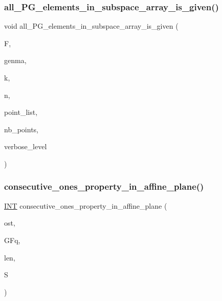 \subsubsection{\texorpdfstring{all\+\_\+\+P\+G\+\_\+elements\+\_\+in\+\_\+subspace\+\_\+array\+\_\+is\+\_\+given()}{all\_PG\_elements\_in\_subspace\_array\_is\_given()}}
{\footnotesize\ttfamily void all\+\_\+\+P\+G\+\_\+elements\+\_\+in\+\_\+subspace\+\_\+array\+\_\+is\+\_\+given (\begin{DoxyParamCaption}\item[{\mbox{\hyperlink{classfinite__field}{finite\+\_\+field}} $\ast$}]{F,  }\item[{\mbox{\hyperlink{galois_8h_a09fddde158a3a20bd2dcadb609de11dc}{I\+NT}} $\ast$}]{genma,  }\item[{\mbox{\hyperlink{galois_8h_a09fddde158a3a20bd2dcadb609de11dc}{I\+NT}}}]{k,  }\item[{\mbox{\hyperlink{galois_8h_a09fddde158a3a20bd2dcadb609de11dc}{I\+NT}}}]{n,  }\item[{\mbox{\hyperlink{galois_8h_a09fddde158a3a20bd2dcadb609de11dc}{I\+NT}} $\ast$}]{point\+\_\+list,  }\item[{\mbox{\hyperlink{galois_8h_a09fddde158a3a20bd2dcadb609de11dc}{I\+NT}} \&}]{nb\+\_\+points,  }\item[{\mbox{\hyperlink{galois_8h_a09fddde158a3a20bd2dcadb609de11dc}{I\+NT}}}]{verbose\+\_\+level }\end{DoxyParamCaption})}

\mbox{\label{projective_8_c_a6a074f977f917c8f70b8437c77321b3f}} 
\subsubsection{\texorpdfstring{consecutive\+\_\+ones\+\_\+property\+\_\+in\+\_\+affine\+\_\+plane()}{consecutive\_ones\_property\_in\_affine\_plane()}}
{\footnotesize\ttfamily \mbox{\hyperlink{galois_8h_a09fddde158a3a20bd2dcadb609de11dc}{I\+NT}} consecutive\+\_\+ones\+\_\+property\+\_\+in\+\_\+affine\+\_\+plane (\begin{DoxyParamCaption}\item[{ostream \&}]{ost,  }\item[{\mbox{\hyperlink{classfinite__field}{finite\+\_\+field}} \&}]{G\+Fq,  }\item[{\mbox{\hyperlink{galois_8h_a09fddde158a3a20bd2dcadb609de11dc}{I\+NT}}}]{len,  }\item[{\mbox{\hyperlink{galois_8h_a09fddde158a3a20bd2dcadb609de11dc}{I\+NT}} $\ast$}]{S }\end{DoxyParamCaption})}

